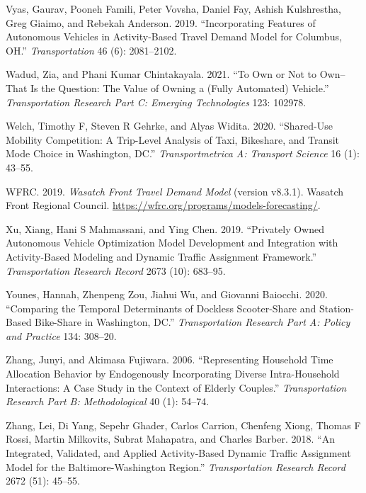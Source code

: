 \documentclass[12pt, oneside, openright]{byuthesis}
\newlength{\cslhangindent}
\newlength{\cslentryspacingunit} %
\newenvironment{CSLReferences}[2] %
 {%
  \setlength{\parindent}{0pt}
  \ifodd #1
  \let\oldpar\par
  \def\par{\hangindent=\cslhangindent\oldpar}
  \fi
  \setlength{\parskip}{#2\cslentryspacingunit}
 }%
 {}
\begin{document}
\begin{CSLReferences}{1}{0}
\leavevmode{}%
Vyas, Gaurav, Pooneh Famili, Peter Vovsha, Daniel Fay, Ashish Kulshrestha, Greg Giaimo, and Rebekah Anderson. 2019. {``Incorporating Features of Autonomous Vehicles in Activity-Based Travel Demand Model for Columbus, OH.''} \emph{Transportation} 46 (6): 2081--2102.

\leavevmode{}%
Wadud, Zia, and Phani Kumar Chintakayala. 2021. {``To Own or Not to Own--That Is the Question: The Value of Owning a (Fully Automated) Vehicle.''} \emph{Transportation Research Part C: Emerging Technologies} 123: 102978.

\leavevmode{}%
Welch, Timothy F, Steven R Gehrke, and Alyas Widita. 2020. {``Shared-Use Mobility Competition: A Trip-Level Analysis of Taxi, Bikeshare, and Transit Mode Choice in Washington, DC.''} \emph{Transportmetrica A: Transport Science} 16 (1): 43--55.

\leavevmode{}%
WFRC. 2019. \emph{Wasatch Front Travel Demand Model} (version v8.3.1). Wasatch Front Regional Council. \url{https://wfrc.org/programs/models-forecasting/}.

\leavevmode{}%
Xu, Xiang, Hani S Mahmassani, and Ying Chen. 2019. {``Privately Owned Autonomous Vehicle Optimization Model Development and Integration with Activity-Based Modeling and Dynamic Traffic Assignment Framework.''} \emph{Transportation Research Record} 2673 (10): 683--95.

\leavevmode{}%
Younes, Hannah, Zhenpeng Zou, Jiahui Wu, and Giovanni Baiocchi. 2020. {``Comparing the Temporal Determinants of Dockless Scooter-Share and Station-Based Bike-Share in Washington, DC.''} \emph{Transportation Research Part A: Policy and Practice} 134: 308--20.

\leavevmode{}%
Zhang, Junyi, and Akimasa Fujiwara. 2006. {``Representing Household Time Allocation Behavior by Endogenously Incorporating Diverse Intra-Household Interactions: A Case Study in the Context of Elderly Couples.''} \emph{Transportation Research Part B: Methodological} 40 (1): 54--74.

\leavevmode{}%
Zhang, Lei, Di Yang, Sepehr Ghader, Carlos Carrion, Chenfeng Xiong, Thomas F Rossi, Martin Milkovits, Subrat Mahapatra, and Charles Barber. 2018. {``An Integrated, Validated, and Applied Activity-Based Dynamic Traffic Assignment Model for the Baltimore-Washington Region.''} \emph{Transportation Research Record} 2672 (51): 45--55.


\end{CSLReferences}
\end{document}
